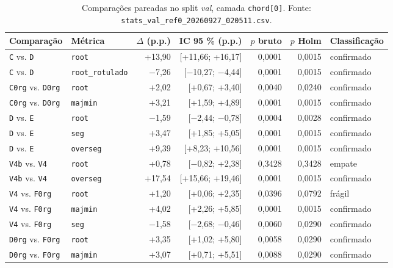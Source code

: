 \begin{table}[t]
  \centering
  \caption{Comparações pareadas no split \emph{val}, camada \texttt{chord[0]}. Fonte: \texttt{stats\_val\_ref0\_20260927\_020511.csv}.}
  \label{tab:stats-val}
  \footnotesize
  \begin{tabular}{llrrrrl}
    \toprule
    Comparação & Métrica & $\Delta$ (p.p.) & IC 95 \% (p.p.) & $p$ bruto & $p$ Holm & Classificação \\
    \midrule
    \texttt{C} vs. \texttt{D} & \texttt{root} & +13,90 & [+11,66; +16,17] & 0,0001 & 0,0015 & confirmado \\
    \texttt{C} vs. \texttt{D} & \texttt{root\_rotulado} & $-$7,26 & [$-$10,27; $-$4,44] & 0,0001 & 0,0015 & confirmado \\
    \texttt{C0rg} vs. \texttt{D0rg} & \texttt{root} & +2,02 & [+0,67; +3,40] & 0,0040 & 0,0240 & confirmado \\
    \texttt{C0rg} vs. \texttt{D0rg} & \texttt{majmin} & +3,21 & [+1,59; +4,89] & 0,0001 & 0,0015 & confirmado \\
    \texttt{D} vs. \texttt{E} & \texttt{root} & $-$1,59 & [$-$2,44; $-$0,78] & 0,0004 & 0,0028 & confirmado \\
    \texttt{D} vs. \texttt{E} & \texttt{seg} & +3,47 & [+1,85; +5,05] & 0,0001 & 0,0015 & confirmado \\
    \texttt{D} vs. \texttt{E} & \texttt{overseg} & +9,39 & [+8,23; +10,56] & 0,0001 & 0,0015 & confirmado \\
    \texttt{V4b} vs. \texttt{V4} & \texttt{root} & +0,78 & [$-$0,82; +2,38] & 0,3428 & 0,3428 & empate \\
    \texttt{V4b} vs. \texttt{V4} & \texttt{overseg} & +17,54 & [+15,66; +19,46] & 0,0001 & 0,0015 & confirmado \\
    \texttt{V4} vs. \texttt{F0rg} & \texttt{root} & +1,20 & [+0,06; +2,35] & 0,0396 & 0,0792 & frágil \\
    \texttt{V4} vs. \texttt{F0rg} & \texttt{majmin} & +4,02 & [+2,26; +5,85] & 0,0001 & 0,0015 & confirmado \\
    \texttt{V4} vs. \texttt{F0rg} & \texttt{seg} & $-$1,58 & [$-$2,68; $-$0,46] & 0,0060 & 0,0290 & confirmado \\
    \texttt{D0rg} vs. \texttt{F0rg} & \texttt{root} & +3,35 & [+1,02; +5,80] & 0,0058 & 0,0290 & confirmado \\
    \texttt{D0rg} vs. \texttt{F0rg} & \texttt{majmin} & +3,07 & [+0,71; +5,51] & 0,0088 & 0,0290 & confirmado \\

\end{tabular}
\end{table}
